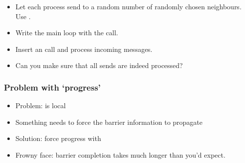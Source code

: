 
\begin{frame}[containsverbatim]\frametitle{}
\end{frame}

\begin{exerciseframe}[ibarrierupdate]
  \begin{itemize}
  \item Let each process send to a random number of randomly chosen
    neighbours. Use .
  \item Write the main loop with the  call.
  \item Insert an  call and process incoming messages.
  \item Can you make sure that all sends are indeed processed?
  \end{itemize}
\end{exerciseframe}

\begin{frame}[containsverbatim]\frametitle{Problem with `progress'}
  \begin{itemize}
  \item Problem:  is local
  \item Something needs to force the barrier information to propagate
  \item Solution: force progress with 
  \item Frowny face: barrier completion takes much longer than you'd expect.
  \end{itemize}
\end{frame}

\endinput

\begin{frame}[containsverbatim]\frametitle{}
\begin{lstlisting}
  
\end{lstlisting}
\end{frame}


